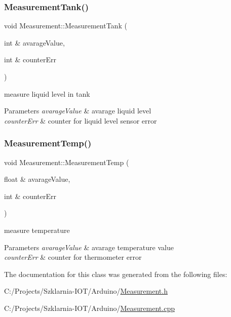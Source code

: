 \subsubsection{\texorpdfstring{Measurement\+Tank()}{MeasurementTank()}}
{\footnotesize\ttfamily void Measurement\+::\+Measurement\+Tank (\begin{DoxyParamCaption}\item[{int \&}]{avarage\+Value,  }\item[{int \&}]{counter\+Err }\end{DoxyParamCaption})}



measure liquid level in tank 


\begin{DoxyParams}{Parameters}
{\em avarage\+Value} & avarage liquid level \\
\hline
{\em counter\+Err} & counter for liquid level sensor error \\
\hline
\end{DoxyParams}
\mbox{\label{class_measurement_a2d1cbf9b660ac8110d4b0cb9155f684e}} 
\subsubsection{\texorpdfstring{Measurement\+Temp()}{MeasurementTemp()}}
{\footnotesize\ttfamily void Measurement\+::\+Measurement\+Temp (\begin{DoxyParamCaption}\item[{float \&}]{avarage\+Value,  }\item[{int \&}]{counter\+Err }\end{DoxyParamCaption})}



measure temperature 


\begin{DoxyParams}{Parameters}
{\em avarage\+Value} & avarage temperature value \\
\hline
{\em counter\+Err} & counter for thermometer error \\
\hline
\end{DoxyParams}


The documentation for this class was generated from the following files\+:\begin{DoxyCompactItemize}
\item 
C\+:/\+Projects/\+Szklarnia-\/\+I\+O\+T/\+Arduino/\hyperlink{_measurement_8h}{Measurement.\+h}\item 
C\+:/\+Projects/\+Szklarnia-\/\+I\+O\+T/\+Arduino/\hyperlink{_measurement_8cpp}{Measurement.\+cpp}\end{DoxyCompactItemize}
